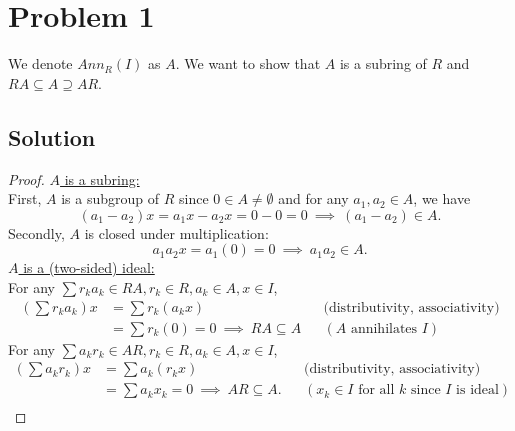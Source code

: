 \documentclass{article}
\title{\mytitle}
\author{\myname}
\date{\today}
\theoremstyle{plain}
\begin{document}
\maketitle
\section*{Problem 1}
We denote $Ann_{R}(I)$ as $A$. We want to show that $A$ is a subring of $R$ and
$RA\subseteq A\supseteq AR$.

\subsection*{Solution}
\begin{proof}
\underline{$A$ is a subring:}\\
First, $A$ is a subgroup of $R$ since $0\in A\neq\emptyset$ and for any $a_{1},a_{2}\in A$, we have
\[(a_{1}-a_{2})x=a_{1}x-a_{2}x=0-0=0\ \implies\ (a_{1}-a_{2})\in A.\]
Secondly, $A$ is closed under multiplication:
\[a_{1}a_{2}x=a_{1}(0)=0\ \implies\ a_{1}a_{2}\in A.\]
\underline{$A$ is a (two-sided) ideal:}\\
For any $\sum r_{k}a_{k}\in RA, r_{k}\in R, a_{k}\in A, x\in I$,
\begin{align*}
  (\sum r_{k}a_{k})x&=\sum r_{k}(a_{k}x)&& \text{(distributivity, associativity)}\\
  & =\sum r_{k}(0)=0\ \implies\ RA\subseteq A && (A\text{ annihilates }I)
\end{align*}
For any $\sum a_{k}r_{k}\in AR, r_{k}\in R, a_{k}\in A, x\in I$,
\begin{align*}
  (\sum a_{k}r_{k})x&=\sum a_{k}(r_{k}x)&& \text{(distributivity, associativity)}\\
                 &=\sum a_{k}x_{k}=0\ \implies\ AR\subseteq A.&& (\text{$x_{k}\in I$ for all $k$ since $I$ is ideal})\\
\end{align*}
\end{proof}
\end{document}
